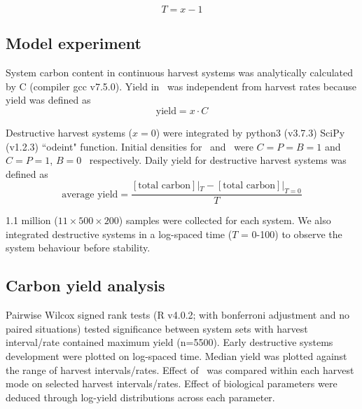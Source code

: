 \documentclass[../thesis.tex]{subfiles} %
\begin{document}
\begin{equation}
    T = x-1
    \label{eq:TvsX}
\end{equation}

\subsection{Model experiment}
System carbon content in continuous harvest systems was analytically calculated by C (compiler gcc v7.5.0). Yield in \PoH\ was independent from harvest rates because yield was defined as
\begin{equation}
    \text{yield} = x\cdot C
    \label{eq:yield}
\end{equation}

Destructive harvest systems ($x=0$) were integrated by python3 (v3.7.3) SciPy (v1.2.3) ``odeint" function.  Initial densities for \PBN\ and \PoN\ were $C=P=B=1$ and $C=P=1$, $B=0$ \den\ respectively.  Daily yield for destructive harvest systems was defined as
\begin{equation}
    \text{average yield} = \dfrac{[\text{total carbon}]|_{T}-[\text{total carbon}]|_{T=0}}{T}
    \label{eq:avgYd}
\end{equation}

1.1 million ($11\times500\times200$) samples were collected for each system.  We also integrated destructive systems in a log-spaced time ($T$ = 0-100) to observe the system behaviour before stability.

\subsection{Carbon yield analysis}
Pairwise Wilcox signed rank tests (R v4.0.2; with bonferroni adjustment and no paired situations) tested significance between system sets with harvest interval/rate contained maximum yield (n=5500).  Early destructive systems development were plotted on log-spaced time.  Median yield was plotted against the range of harvest intervals/rates.  Effect of \bac\ was compared within each harvest mode on selected harvest intervals/rates.  Effect of biological parameters were deduced through log-yield distributions across each parameter.
\end{document}
